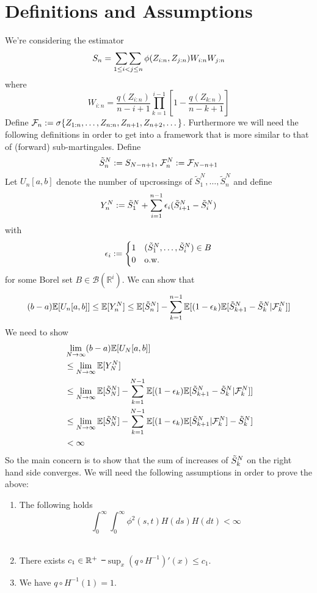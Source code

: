 \section{Definitions and Assumptions}
%
We're considering the estimator
$$S_{n} = \mathop{\sum\sum}\limits_{1\leq i<j\leq n} \phi(Z_{i:n}, Z_{j:n}) W_{i:n} W_{j:n}$$
where 
$$W_{i:n} = \frac{q(Z_{i:n})}{n-i+1}\prod_{k=1}^{i-1}\left[1-\frac{q(Z_{k:n})}{n-k+1}\right]$$
Define $\mathcal{F}_n := \sigma\{Z_{1:n}, \dots, Z_{n:n}, Z_{n+1}, Z_{n+2}, \dots\}$. Furthermore we will need the following definitions in order to get into a framework that is more similar to that of (forward) sub-martingales. Define
$$\tilde{S}^N_n := S_{N-n+1} \textrm{, } \mathcal{F}_n^N := \mathcal{F}_{N-n+1}$$
%
Let $U_n[a,b]$ denote the number of upcrossings of $\tilde{S}_1^N, \dots, \tilde{S}_n^N$ and define 
$$Y_n^N := \tilde{S}_{1}^N + \sum_{i=1}^{n-1} \epsilon_i (\tilde{S}_{i+1}^N - \tilde{S}_{i}^N) $$
with 
\[ \epsilon_i := \begin{cases} 
1 & (\tilde{S}_{1}^N,\dots, \tilde{S}_{i}^N) \in B\\
0 & \textrm{o.w.}
\end{cases}
\]
for some Borel set $B \in  \mathcal{B}(\mathbb{R}^i)$.
%
We can show that 
$$(b-a) \mathbb{E}[U_n[a,b]] \leq \mathbb{E}[Y_n^N] \leq \mathbb{E}[\tilde{S}_{n}^N] - \sum_{k=1}^{n-1} \mathbb{E}[(1-\epsilon_k) \mathbb{E}[\tilde{S}_{k+1}^N - \tilde{S}_{k}^N | \mathcal{F}_k^N]]$$
%
We need to show 
\begin{align}
&\lim\limits_{N\to\infty}(b-a) \mathbb{E}[U_N[a,b]]\nonumber\\
&\leq \lim\limits_{N\to\infty}\mathbb{E}[Y_N^N]\nonumber\\
&\leq \lim\limits_{N\to\infty}\mathbb{E}[\tilde{S}_{N}^N] - \sum_{k=1}^{N-1} \mathbb{E}[(1-\epsilon_k) \mathbb{E}[\tilde{S}_{k+1}^N - \tilde{S}_{k}^N | \mathcal{F}_k^N]]\nonumber\\
&\leq \lim\limits_{N\to\infty}\mathbb{E}[\tilde{S}_{N}^N] - \sum_{k=1}^{N-1} \mathbb{E}[(1-\epsilon_k) \mathbb{E}[\tilde{S}_{k+1}^N | \mathcal{F}_k^N]  - \tilde{S}_{k}^N]\nonumber\\
&<\infty\nonumber
\end{align}
%
So the main concern is to show that the sum of increases of $\tilde{S}_{k}^N$ on the right hand side converges. We will need the following assumptions in order to prove the above:
\begin{enumerate}[({A}1)]
	\item The following holds
	$$\int_{0}^{\infty}\int_{0}^{\infty} \phi^2(s,t) H(ds)H(dt) < \infty$$ \label{as:sup_sn}\\
	\item There exists $c_1 \in \mathbb{R}^+$ \st\ $\sup_{x} (q\circ H^{-1})'(x) \leq c_1$. \label{as:sup_qprime}
	\item We have $q\circ H^{-1}(1) = 1$. \label{as:q_H_one}
\end{enumerate}
%

